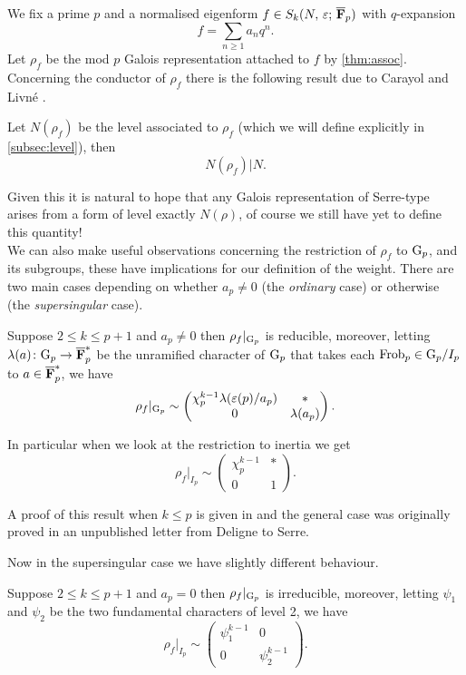 \documentclass[a4paper,12pt]{article}
\begin{document}
We fix a prime $p$ and a normalised eigenform $f \in S_k(N,\,\varepsilon;\,\overline{\mathbf{F}}_p)$ with $q$-expansion
\[
f = \sum_{n\ge 1} a_nq^n.
\]
Let $\rho_f$ be the mod $p$ Galois representation attached to $f$ by \cref{thm:assoc}.
Concerning the conductor of $\rho_f$ there is the following result due to Carayol and Livn\'e \cite{Carayol, Livne}.

\begin{thm}\label{thm:level}
Let $N(\rho_f)$ be the level associated to $\rho_f$ (which we will define explicitly in \cref{subsec:level}), then
\[
N(\rho_f)|N.
\]
\end{thm}

Given this it is natural to hope that any Galois representation of Serre-type arises from a form of level exactly $N(\rho)$, of course we still have yet to define this quantity!
\\[12pt] \noindent
We can also make useful observations concerning the restriction of $\rho_f$ to $\mathrm{G}_p$, and its subgroups, these have implications for our definition of the weight.
There are two main cases depending on whether $a_p \ne 0$ (the \emph{ordinary} case) or otherwise (the \emph{supersingular} case).

\begin{thm}[Deligne]\label{thm:ordinary}
Suppose $2\le k\le p+1$ and $a_p \ne 0$ then $\rho_{f}|_{\mathrm{G}_p}$ is reducible, moreover, letting $\lambda(a)\colon \mathrm{G}_p \to \overline{\mathbf{F}}_p^*$ be the unramified character of $\mathrm{G}_p$ that takes each $\operatorname{Frob}_p \in \mathrm{G}_p /I_p$ to $a\in\overline{\mathbf{F}}_p^*$, we have
\[
\rho_{f}|_{\mathrm{G}_p} \sim \begin{pmatrix} \chi_p^{k-1}\lambda(\varepsilon(p)/a_p) & * \\ 0 & \lambda(a_p)\end{pmatrix}.
\]

In particular when we look at the restriction to inertia we get
\[
\rho_{f}|_{I_{p}} \sim \begin{pmatrix} \chi_p^{k-1} & * \\ 0 & 1\end{pmatrix}.
\]
\end{thm}

A proof of this result when $k \le p$ is given in \cite{Gross} and the general case was originally proved in an unpublished letter from Deligne to Serre.

Now in the supersingular case we have slightly different behaviour.

\begin{thm}[Fontaine]\label{thm:super}
Suppose $2\le k \le p +1$ and $a_p = 0$ then $\rho_{f}|_{\mathrm{G}_p}$ is irreducible, moreover, letting $\psi_1$ and $\psi_2$ be the two fundamental characters of level 2, we have
\[
\rho_{f}|_{I_p} \sim \begin{pmatrix} \psi_1^{k-1} & 0 \\ 0 & \psi_2^{k-1}\end{pmatrix}.
\]
\end{thm}
\end{document}
